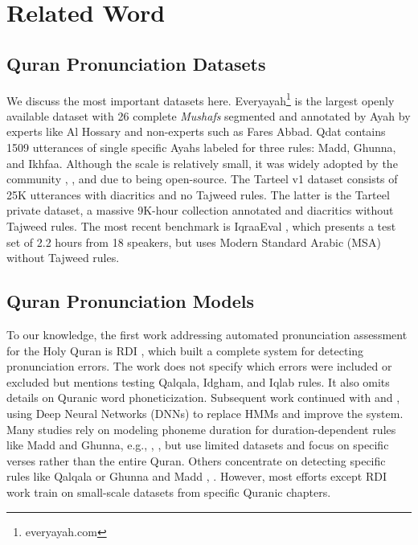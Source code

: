 
\chapter{Related Word} %

\label{Chapter2} %




\section{Quran Pronunciation Datasets}

We discuss the most important datasets here. Everyayah\footnote{everyayah.com} is the largest openly available dataset with 26 complete \textit{Mushafs} segmented and annotated by Ayah by experts like Al Hossary and non-experts such as Fares Abbad. Qdat \cite{osman2021qdat} contains 1509 utterances of single specific Ayahs labeled for three rules: Madd, Ghunna, and Ikhfaa. Although the scale is relatively small, it was widely adopted by the community \cite{10092350}, \cite{10092350}, and \cite{shaiakhmetov2025evaluation} due to being open-source. The Tarteel v1 dataset \cite{khan2021tarteel} consists of 25K utterances with diacritics and no Tajweed rules. The latter is the Tarteel \cite{tarteelai} private dataset, a massive 9K-hour collection annotated and diacritics without Tajweed rules. The most recent benchmark is IqraaEval \cite{kheir2025towards}, which presents a test set of 2.2 hours from 18 speakers, but uses Modern Standard Arabic (MSA) without Tajweed rules.

\section{Quran Pronunciation Models}

To our knowledge, the first work addressing automated pronunciation assessment for the Holy Quran is RDI \cite{sherif2007enhancing}, which built a complete system for detecting pronunciation errors. The work does not specify which errors were included or excluded but mentions testing Qalqala, Idgham, and Iqlab rules. It also omits details on Quranic word phoneticization. Subsequent work continued with \cite{abdou2014computer} and \cite{al2018computer}, using Deep Neural Networks (DNNs) to replace HMMs and improve the system. Many studies rely on modeling phoneme duration for duration-dependent rules like Madd and Ghunna, e.g., \cite{mohammed2017recognition}, \cite{alqadasi2023improving}, but use limited datasets and focus on specific verses rather than the entire Quran. Others concentrate on detecting specific rules like Qalqala \cite{10092350} or Ghunna and Madd \cite{shaiakhmetov2025evaluation}, \cite{10485145}. However, most efforts except RDI work train on small-scale datasets from specific Quranic chapters.

